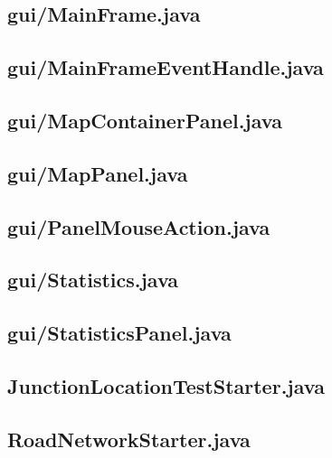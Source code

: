 \subsection{gui/MainFrame.java}

\newpage
\subsection{gui/MainFrameEventHandle.java}

\newpage
\subsection{gui/MapContainerPanel.java}

\newpage
\subsection{gui/MapPanel.java}

\newpage
\subsection{gui/PanelMouseAction.java}

\newpage
\subsection{gui/Statistics.java}

\newpage
\subsection{gui/StatisticsPanel.java}

\newpage
\subsection{JunctionLocationTestStarter.java}

\newpage
\subsection{RoadNetworkStarter.java}

\newpage
